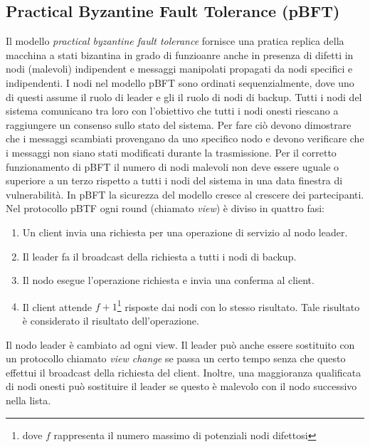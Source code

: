 \subsection{Practical Byzantine Fault Tolerance (pBFT)}
Il modello \textit{practical byzantine fault tolerance} fornisce una pratica replica della macchina a stati
bizantina in grado di funzioanre anche in presenza di difetti
in nodi (malevoli) indipendent e messaggi manipolati propagati da nodi specifici e indipendenti.
I nodi nel modello pBFT sono ordinati sequenzialmente, dove uno di questi assume il ruolo di leader
e gli il ruolo di nodi di backup. Tutti i nodi del sistema comunicano tra loro
con l'obiettivo che tutti i nodi onesti riescano a raggiungere un consenso sullo stato del sistema.
Per fare ciò devono dimostrare che i messaggi scambiati provengano da uno specifico nodo e devono
verificare che i messaggi non siano stati modificati durante la trasmissione.
Per il corretto funzionamento di pBFT il numero di nodi malevoli non deve essere uguale o superiore
a un terzo rispetto a tutti i nodi del sistema in una data finestra di vulnerabilità.
In pBFT la sicurezza del modello cresce al crescere dei partecipanti.
Nel protocollo pBTF ogni round (chiamato \textit{view}) è diviso in quattro fasi:
\begin{enumerate}
	\item Un client invia una richiesta per una operazione di servizio al nodo leader.
	\item Il leader fa il broadcast della richiesta a tutti i nodi di backup.
	\item Il nodo esegue l'operazione richiesta e invia una conferma al client.
	\item Il client attende $ f + 1 $\footnote{dove $ f $ rappresenta
		      il numero massimo di potenziali nodi difettosi} risposte dai nodi con lo stesso risultato.
	      Tale risultato è considerato il risultato dell'operazione.
\end{enumerate}
Il nodo leader è cambiato ad ogni view. Il leader può anche essere sostituito con un protocollo chiamato
\textit{view change} se passa un certo tempo senza che questo effettui il broadcast
della richiesta del client. Inoltre, una maggioranza qualificata di nodi onesti può sostituire il leader
se questo è malevolo con il nodo successivo nella lista.

